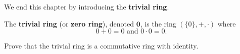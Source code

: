 We end this chapter by introducing the \textbf{trivial ring}.
\begin{definition}
    The \textbf{trivial ring} (or \textbf{zero ring}), denoted $\textbf{0}$, is the ring $(\{0\}, +, \cdot)$ where
    \[
        0 + 0 = 0 \text{ and } 0 \cdot 0 = 0.    
    \]
\end{definition}
\begin{exercise}
    Prove that the trivial ring is a commutative ring with identity.
\end{exercise}
